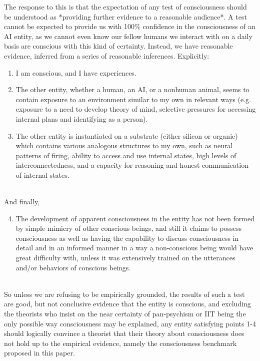 \documentclass{article}
\begin{document}
The response to this is that the expectation of any test of consciousness should be understood as *providing further evidence to a reasonable audience*. A test cannot be expected to provide us with 100\% confidence in the consciousness of an AI entity, as we cannot even know our fellow humans we interact with on a daily basis are conscious with this kind of certainty. Instead, we have reasonable evidence, inferred from a series of reasonable inferences. Explicitly:
\begin{enumerate}
    \item I am conscious, and I have experiences.
    \item The other entity, whether a human, an AI, or a nonhuman animal, seems to contain exposure to an environment similar to my own in relevant ways (e.g. exposure to a need to develop theory of mind, selective pressures for accessing internal plans and identifying as a person).
    \item The other entity is instantiated on a substrate (either silicon or organic) which contains various analogous structures to my own, such as neural patterns of firing, ability to access and use internal states, high levels of interconnectedness, and a capacity for reasoning and honest communication of internal states. \\ \\
\end{enumerate}
And finally,\\ 
\begin{enumerate}
    \setcounter{enumi}{3}
    \item The development of apparent consciousness in the entity has not been formed by simple mimicry of other conscious beings, and still it claims to possess consciousness as well as having the capability to discuss consciousness in detail and in an informed manner in a way a non-conscious being would have great difficulty with, unless it was extensively trained on the utterances and/or behaviors of conscious beings.
\end{enumerate}
\ \\
So unless we are refusing to be empirically grounded, the results of such a test are good, but not conclusive evidence that the entity is conscious, and excluding the theorists who insist on the near certainty of pan-psychism or IIT being the only possible way consciousness may be explained, any entity satisfying points 1-4 should logically convince a theorist that their theory about consciousness does not hold up to the empirical evidence, namely the consciousness benchmark proposed in this paper.
\end{document}
